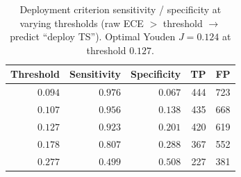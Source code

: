\documentclass[review,12pt,nonatbib]{elsarticle}
\begin{document}
\begin{table}[t]
\centering
\caption{Deployment criterion sensitivity / specificity at varying
thresholds (raw ECE $>$ threshold $\rightarrow$ predict ``deploy TS'').
Optimal Youden $J=0.124$ at threshold $0.127$.}
\label{tab:deploy_sens}
\begin{tabular}{rrrrr}
\toprule
Threshold & Sensitivity & Specificity & TP & FP \\
\midrule
$0.094$ & $0.976$ & $0.067$ & 444 & 723 \\
$0.107$ & $0.956$ & $0.138$ & 435 & 668 \\
$0.127$ & $0.923$ & $0.201$ & 420 & 619 \\
$0.178$ & $0.807$ & $0.288$ & 367 & 552 \\
$0.277$ & $0.499$ & $0.508$ & 227 & 381 \\
\bottomrule
\end{tabular}
\end{table}
\end{document}
